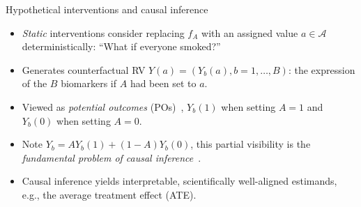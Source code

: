 \documentclass{beamer}
\begin{document}

\begin{frame}[c]{Hypothetical interventions and causal inference}
\begin{center}
\begin{itemize}
  \itemsep6pt
  \item \textit{Static} interventions consider replacing $f_A$ with an assigned
    value $a \in \mathcal{A}$ deterministically: ``What if everyone smoked?''
  \item Generates counterfactual RV $Y(a) = (Y_b(a), b = 1, \ldots, B)$: the
    expression of the $B$ biomarkers if $A$ had been set to $a$.
  \item Viewed as \textit{potential outcomes} (POs)~\citep{rubin2005causal},
    $Y_b(1)$ when setting $A=1$ and $Y_b(0)$ when setting $A = 0$.
  \item Note $Y_b = A Y_b(1) + (1 - A) Y_b(0)$, this partial visibility is the
    \textit{fundamental problem of causal
    inference}~\citep{holland1986statistics}.
  \item Causal inference yields interpretable, scientifically well-aligned
    estimands, e.g., the average treatment effect (ATE).
\end{itemize}
\end{center}

\end{frame}

\end{document}

